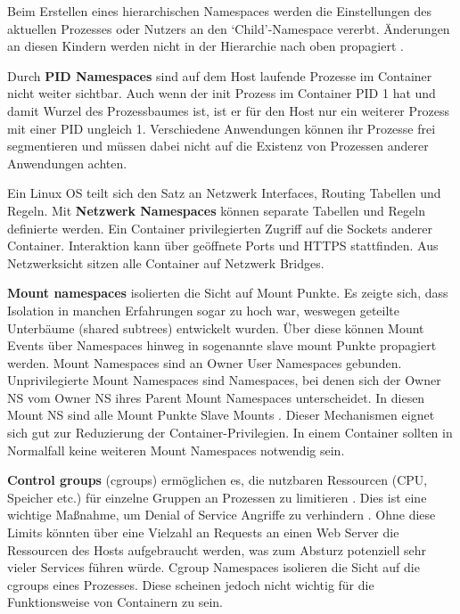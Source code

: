 Beim Erstellen eines hierarchischen Namespaces werden die Einstellungen des aktuellen Prozesses oder Nutzers an den `Child'-Namespace vererbt. Änderungen an diesen Kindern werden nicht in der Hierarchie nach oben propagiert \cite{man-7-ns}. 

Durch \textbf{PID Namespaces} sind auf dem Host laufende Prozesse im Container nicht weiter sichtbar. Auch wenn der init Prozess im Container PID 1 hat und damit Wurzel des Prozessbaumes ist, ist er für den Host nur ein weiterer Prozess mit einer PID ungleich 1. Verschiedene Anwendungen können ihr Prozesse frei segmentieren und müssen dabei nicht auf die Existenz von Prozessen anderer
Anwendungen achten.

Ein Linux OS teilt sich den Satz an Netzwerk Interfaces, Routing Tabellen und Regeln. Mit \textbf{Netzwerk Namespaces} können separate Tabellen und Regeln definierte werden.
Ein Container privilegierten Zugriff auf die Sockets anderer Container. Interaktion kann über geöffnete Ports und HTTPS stattfinden.
Aus Netzwerksicht sitzen alle Container auf Netzwerk Bridges. %

\textbf{Mount namespaces} isolierten die Sicht auf Mount Punkte. Es zeigte sich, dass Isolation in manchen Erfahrungen sogar zu hoch war, weswegen geteilte Unterbäume (shared subtrees) entwickelt wurden. Über diese können Mount Events über Namespaces hinweg in sogenannte slave mount Punkte propagiert werden. Mount Namespaces sind an Owner User Namespaces gebunden. Unprivilegierte Mount Namespaces sind Namespaces, bei denen sich der Owner NS vom Owner NS ihres Parent Mount Namespaces
unterscheidet. In diesen Mount NS sind alle Mount Punkte Slave Mounts \cite{man-mount-ns}. Dieser Mechanismen eignet sich gut zur Reduzierung der Container-Privilegien. In einem Container sollten in Normalfall keine weiteren Mount Namespaces notwendig sein.

\textbf{Control groups} (cgroups) ermöglichen es, die nutzbaren Ressourcen (CPU, Speicher etc.) für einzelne Gruppen an Prozessen zu limitieren \cite{man-cgroups}. Dies ist eine wichtige Maßnahme, um Denial of Service Angriffe zu verhindern \cite{lxc-sec}. Ohne diese Limits könnten über eine Vielzahl an Requests an einen Web Server die Ressourcen des Hosts aufgebraucht werden, was zum Absturz potenziell sehr vieler Services führen würde.
Cgroup Namespaces isolieren die Sicht auf die cgroups eines Prozesses. Diese scheinen jedoch nicht wichtig für die Funktionsweise von Containern zu sein.

